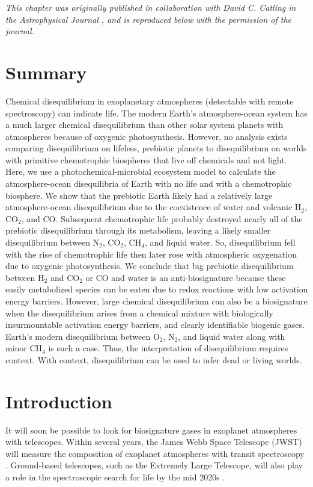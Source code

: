 \noindent \textit{This chapter was originally published in collaboration with David C. Catling in the Astrophysical Journal \citep{Wogan_2020_diseq}, and is reproduced below with the permission of the journal.}

\section*{\centering Summary}

Chemical disequilibrium in exoplanetary atmospheres (detectable with remote spectroscopy) can indicate life. The modern Earth's atmosphere-ocean system has a much larger chemical disequilibrium than other solar system planets with atmospheres because of oxygenic photosynthesis. However, no analysis exists comparing disequilibrium on lifeless, prebiotic planets to disequilibrium on worlds with primitive chemotrophic biospheres that live off chemicals and not light. Here, we use a photochemical-microbial ecosystem model to calculate the atmosphere-ocean disequilibria of Earth with no life and with a chemotrophic biosphere. We show that the prebiotic Earth likely had a relatively large atmosphere-ocean disequilibrium due to the coexistence of water and volcanic H$_2$, CO$_2$, and CO. Subsequent chemotrophic life probably destroyed nearly all of the prebiotic disequilibrium through its metabolism, leaving a likely smaller disequilibrium between N$_2$, CO$_2$, CH$_4$, and liquid water. So, disequilibrium fell with the rise of chemotrophic life then later rose with atmospheric oxygenation due to oxygenic photosynthesis. We conclude that big prebiotic disequilibrium between H$_2$ and CO$_2$ or CO and water is an anti-biosignature because these easily metabolized species can be eaten due to redox reactions with low activation energy barriers. However, large chemical disequilibrium can also be a biosignature when the disequilibrium arises from a chemical mixture with biologically insurmountable activation energy barriers, and clearly identifiable biogenic gases. Earth's modern disequilibrium between O$_2$, N$_2$, and liquid water along with minor CH$_4$ is such a case. Thus, the interpretation of disequilibrium requires context. With context, disequilibrium can be used to infer dead or living worlds.

\section{Introduction}

It will soon be possible to look for biosignature gases in exoplanet atmospheres with telescopes. Within several years, the James Webb Space Telescope (JWST) will measure the composition of exoplanet atmospheres with transit spectroscopy \citep{Fischer_2019,Gaudi_2019}. Ground-based telescopes, such as the Extremely Large Telescope, will also play a role in the spectroscopic search for life by the mid 2020s \citep{Lopez_2019,Snellen_2013}.

